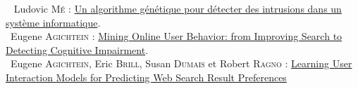 \documentclass[a4paper, 11pt]{article}
\begin{document}
\noindent [2]~ Ludovic M\textsc{é} :  \href{http://www.rennes.supelec.fr/rennes/si/equipe/lme/PUBLI/valgo95.pdf}{Un algorithme génétique pour détecter des intrusions dans
un système informatique}.\\

\noindent [3]~Eugene A\textsc{gichtein} : \href{http://www.cse.lehigh.edu/academics/graduate-programs/graduate-computer-engineering/2-uncategorised/235-agichtein}{Mining Online User Behavior: from Improving Search to Detecting Cognitive Impairment}.\\

\noindent [4]~Eugene A\textsc{gichtein}, Eric B\textsc{rill}, Susan D\textsc{umais} et Robert R\textsc{agno} : \href{http://research.microsoft.com/pubs/68153/sigir2006-fp338-preferences-agichtein.pdf}{Learning User Interaction Models for Predicting Web Search Result Preferences}
\end{document}
